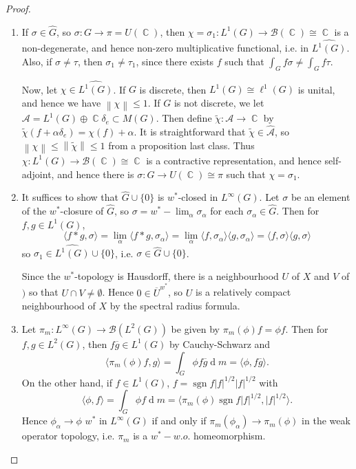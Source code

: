 \documentclass[11pt, a4paper]{memoir}
\DeclareMathOperator{\C}{{\mathbb{C}}}
\newcommand{\norm}[1]{\ensuremath{\left\lVert#1\right\rVert}}
\theoremstyle{change}
\theoremstyle{plain}
\theoremstyle{nonumberplain}
\newtheorem{proof}{Proof}
\DeclareMathOperator{\sgn}{sgn}
\renewcommand{\d}[1]{\ensuremath{\operatorname{d}\!{#1}}}
\numberwithin{equation}{section}
\begin{document}
\begin{proof}
    \begin{enumerate}[nl,r]
        \item If $\sigma\in\widehat{G}$, so $\sigma:G\to\pi = U(\C)$, then $\chi=\sigma_1:L^1(G)\to\mathcal{B}(\C)\cong\C$ is a non-degenerate, and hence non-zero multiplicative functional, i.e. in $\widehat{L^1(G)}$.
            Also, if $\sigma\neq\tau$, then $\sigma_1\neq\tau_1$, since there exists $f$ such that $\int_G f\sigma\neq\int_G f\tau$.
            
            Now, let $\chi\in\widehat{L^1(G)}$.
            If $G$ is discrete, then $L^1(G)\cong\ell^1(G)$ is unital, and hence we have $\norm{\chi}\leq 1$.
            If $G$ is not discrete, we let $\mathcal{A}=L^1(G)\oplus \C\delta_e\subset M(G)$.
            Then define $\tilde\chi:\mathcal{A}\to\C$ by $\tilde\chi(f+\alpha\delta_e)=\chi(f)+\alpha$.
            It is straightforward that $\tilde\chi\in\widehat{\mathcal{A}}$, so $\norm{\chi}\leq\norm{\tilde\chi}\leq 1$ from a proposition last class.
            Thus $\chi:L^1(G)\to\mathcal{B}(\C)\cong\C$ is a contractive representation, and hence self-adjoint, and hence there is $\sigma:G\to U(\C)\cong\pi$ such that $\chi=\sigma_1$.
        \item It suffices to show that $\widehat{G}\cup\{0\}$ is $w^*$-closed in $L^\infty(G)$.
            Let $\sigma$ be an element of the $w^*$-closure of $\widehat{G}$, so $\sigma=w^*-\lim_\alpha\sigma_\alpha$ for each $\sigma_\alpha\in\widehat{G}$.
            Then for $f,g\in L^1(G)$,
            \begin{equation*}
                \langle f*g,\sigma\rangle=\lim_\alpha\langle f*g,\sigma_\alpha\rangle=\lim_\alpha\langle f,\sigma_\alpha\rangle\langle g,\sigma_\alpha\rangle=\langle f,\sigma\rangle\langle g,\sigma\rangle
            \end{equation*}
            so $\sigma_1\in\widehat{L^1(G)}\cup\{0\}$, i.e. $\sigma\in\widehat{G}\cup\{0\}$.

            Since the $w^*$-topology is Hausdorff, there is a neighbourhood $U$ of $X$ and $V$ of $)$ so that $U\cap V\neq\emptyset$.
            Hence $0\in\overline{U}^{w^*}$, so $U$ is a relatively compact neighbourhood of $X$ by the spectral radius formula.
        \item Let $\pi_m:L^\infty(G)\to\mathcal{B}(L^2(G))$ be given by $\pi_m(\phi)f=\phi f$.
            Then for $f,g\in L^2(G)$, then $f\overline{g}\in L^1(G)$ by Cauchy-Schwarz and
            \begin{equation*}
                \langle \pi_m(\phi)f,g\rangle=\int_G\phi f\overline{g}\d{m}=\langle\phi,f\overline{g}\rangle.
            \end{equation*}
            On the other hand, if $f\in L^1(G)$, $f=\sgn f|f|^{1/2}|f|^{1/2}$ with
            \begin{equation*}
                \langle\phi,f\rangle=\int_G\phi f\d{m}=\langle\pi_m(\phi)\sgn f|f|^{1/2},|f|^{1/2}\rangle.
            \end{equation*}
            Hence $\phi_\alpha\to \phi$ $w^*$ in $L^\infty(G)$ if and only if $\pi_m(\phi_\alpha)\to\pi_m(\phi)$ in the weak operator topology, i.e. $\pi_m$ is a $w^*-w.o.$ homeomorphism.


\end{enumerate}
\end{proof}
\end{document}
